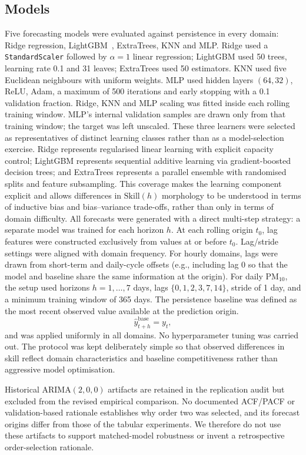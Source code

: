 \documentclass[pdflatex,sn-mathphys]{sn-jnl}
\begin{document}
\subsection{Models}
Five forecasting models were evaluated against persistence in every domain:
Ridge regression, LightGBM~\citep{ke2017lightgbm}, ExtraTrees, KNN and MLP.
Ridge used a \texttt{StandardScaler} followed by $\alpha=1$ linear regression;
LightGBM used 50 trees, learning rate 0.1 and 31 leaves; ExtraTrees used 50
estimators. KNN used five Euclidean neighbours with uniform weights. MLP used
hidden layers $(64,32)$, ReLU, Adam, a maximum of 500 iterations and early
stopping with a 0.1 validation fraction. Ridge, KNN and MLP scaling was fitted
inside each rolling training window. MLP's internal validation samples are
drawn only from that training window; the target was left unscaled.
These three learners were selected as representatives of distinct learning classes rather than as a model-selection exercise. Ridge represents regularised linear learning with explicit capacity control; LightGBM represents sequential additive learning via gradient-boosted decision trees; and ExtraTrees represents a parallel ensemble with randomised splits and feature subsampling. This coverage makes the learning component explicit and allows differences in $\mathrm{Skill}(h)$ morphology to be understood in terms of inductive bias and bias--variance trade-offs, rather than only in terms of domain difficulty.
All forecasts were generated with a direct multi-step strategy: a separate model was trained for each horizon $h$. At each rolling origin $t_0$, lag features were constructed exclusively from values at or before $t_0$.
Lag/stride settings were aligned with domain frequency. For hourly domains, lags were drawn from short-term and daily-cycle offsets (e.g., including lag 0 so that the model and baseline share the same information at the origin). For daily PM$_{10}$, the setup used horizons $h=1,\ldots,7$ days, lags $\{0,1,2,3,7,14\}$, stride of 1 day, and a minimum training window of 365 days.
The persistence baseline was defined as the most recent observed value available at the prediction origin.
\begin{equation}
\hat{y}^{\mathrm{base}}_{t+h} = y_{t},
\end{equation}
and was applied uniformly in all domains.
No hyperparameter tuning was carried out. The protocol was kept deliberately simple so that observed differences in skill reflect domain characteristics and baseline competitiveness rather than aggressive model optimisation.

Historical ARIMA$(2,0,0)$ artifacts are retained in the replication audit but
excluded from the revised empirical comparison. No documented ACF/PACF or
validation-based rationale establishes why order two was selected, and its
forecast origins differ from those of the tabular experiments. We therefore
do not use these artifacts to support matched-model robustness or invent a
retrospective order-selection rationale.
\end{document}
